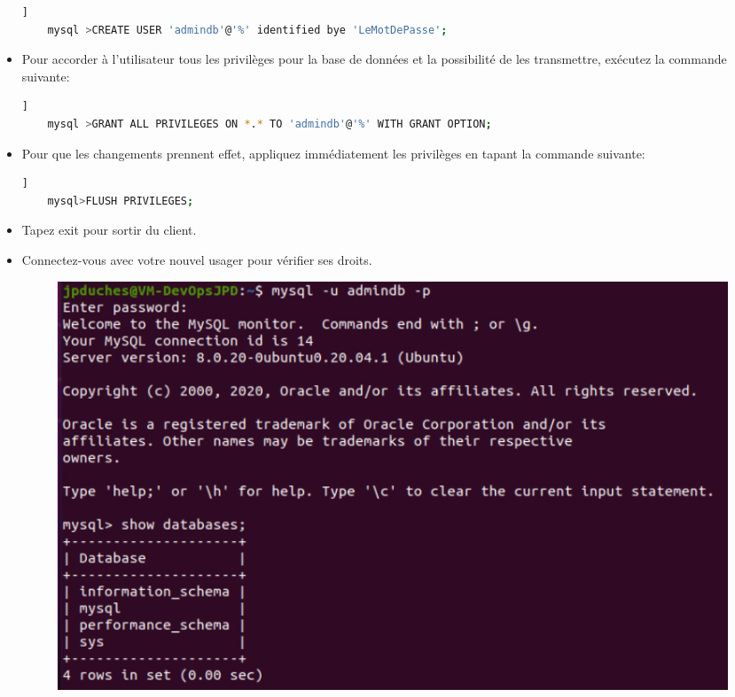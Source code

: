 \begin{itemize}
	\begin{lstlisting}[language=bash]   ]
	mysql >CREATE USER 'admindb'@'%' identified bye 'LeMotDePasse';
	\end{lstlisting}
	\item Pour accorder à l’utilisateur tous les privilèges pour la base de données et la possibilité de les transmettre, exécutez la commande suivante:
	\begin{lstlisting}[language=bash]   ]
	mysql >GRANT ALL PRIVILEGES ON *.* TO 'admindb'@'%' WITH GRANT OPTION;
	\end{lstlisting}
	\item Pour que les changements prennent effet, appliquez immédiatement les privilèges en tapant la commande suivante:
	\begin{lstlisting}[language=bash]   ]
	mysql>FLUSH PRIVILEGES;
	\end{lstlisting}
	\item Tapez {\color{blue}exit} pour sortir du client.
	\item Connectez-vous avec votre nouvel usager pour vérifier ses droits.
	
	
	\begin{figure}[!htb]
		\centering
		\includegraphics[scale=0.8]{images/capture14}
	\end{figure}
	
	\end{itemize}  
	
%	
	
